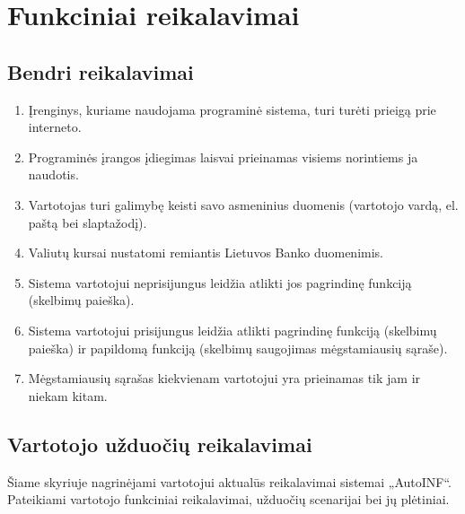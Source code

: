 \documentclass[12pt]{article}
\renewcommand{\thesubsection}{FR\arabic{subsection}}
\renewcommand*{\theenumi}{\thesubsection.\arabic{enumi}}
\renewcommand*{\theenumii}{\thesubsubsection.\theenumi.\arabic{enumii}}
\begin{document}
	\section*{Funkciniai reikalavimai}
	
	\subsection{Bendri reikalavimai}
	\begin{enumerate}[labelindent=10pt,leftmargin=2.2cm]
		\item Įrenginys, kuriame naudojama programinė sistema, turi turėti prieigą prie interneto.
		\item Programinės įrangos įdiegimas laisvai prieinamas visiems norintiems ja naudotis.
		\item Vartotojas turi galimybę keisti savo asmeninius duomenis (vartotojo vardą, el. paštą bei slaptažodį).
		\item Valiutų kursai nustatomi remiantis Lietuvos Banko duomenimis.
		\item Sistema vartotojui neprisijungus leidžia atlikti jos pagrindinę funkciją (skelbimų paieška).
		\item Sistema vartotojui prisijungus leidžia atlikti pagrindinę funkciją (skelbimų paieška) ir papildomą funkciją (skelbimų saugojimas mėgstamiausių sąraše).
		\item Mėgstamiausių sąrašas kiekvienam vartotojui yra prieinamas tik jam ir niekam kitam.
	\end{enumerate}
	\pagebreak
	
	\renewcommand*{\theenumi}{\thesubsubsection.\arabic{enumi}}
	\renewcommand*{\theenumii}{\thesubsubsection.\theenumi.\arabic{enumii}}
	\renewcommand*{\theenumiii}{\thesubsubsection.\theenumi.\theenumii.\arabic{enumiii}}
	\subsection{Vartotojo užduočių reikalavimai}\label{Vartotojo_reikalavimai}
	Šiame skyriuje nagrinėjami vartotojui aktualūs reikalavimai sistemai „AutoINF“. Pateikiami vartotojo funkciniai reikalavimai, užduočių scenarijai bei jų plėtiniai.
	
\end{document}
